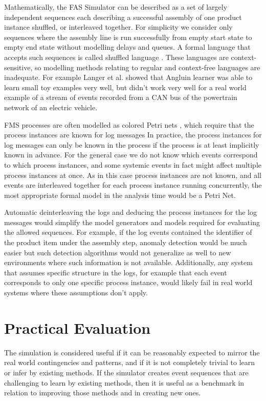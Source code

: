 \documentclass[journal]{IEEEtran}
\begin{document}
Mathematically, the FAS Simulator can be described as a set of largely independent sequences each describing a successful assembly of one product instance shuffled, or interleaved
together.
For simplicity we consider only sequences where the assembly line is run successfully from empty start state to empty end state without modelling delays and queues.
A formal language that accepts such sequences is called shuffled language \cite{berglund2011recognizing}. These languages are context-sensitive, so modelling methods
relating to regular and context-free languages are inadequate. For example Langer et al. \cite{langer2011self} showed that Angluin learner was able to learn small
toy examples very well, but didn't work very well for a real world example of a stream of events recorded from a CAN bus of the powertrain network of an electric vehicle.

FMS processes are often modelled as colored Petri nets \cite{saitou2002robust}, which require that the process instances are known for log messages
In practice, the process instances for log messages can only be known in the process
if the process is at least implicitly known in advance. For the general case we do not know which events correspond to which process instances, and some systemic events
in fact might affect multiple process instances at once. As in this
case process instances are not known, and all events are interleaved together for each process instance running concurrently, the most appropriate formal
model in the analysis time would be a Petri Net.

Automatic deinterleaving the logs and deducing the process instances for the log messages would simplify the model generators and models required
for evaluating the allowed sequences.
For example, if the log events contained the identifier of the product
item under the assembly step, anomaly detection would be much easier but such detection algorithms would not generalize as well
to new environments where such information is not available. Additionally, any system that assumes specific structure in the logs, for example that each event corresponds to
only one specific process instance, would likely fail in real world systems where these assumptions don't apply.

\section{Practical Evaluation}

The simulation is considered useful if it can be reasonably expected to mirror the real world contingencies and patterns, and if it is not completely trivial to
learn or infer by existing methods. If the simulator creates event sequences that are challenging to learn by existing methods, then it is useful as a benchmark
in relation to improving those methods and in creating new ones.
\end{document}
